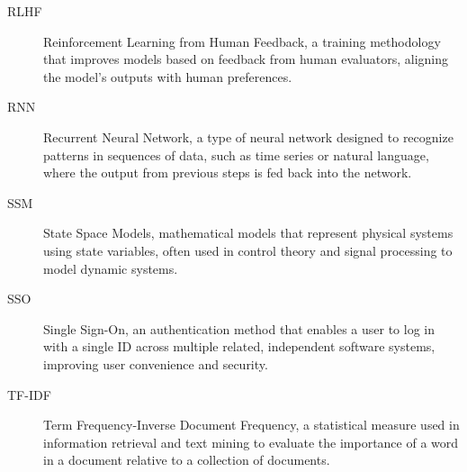 \begin{description}
    \item[RLHF] Reinforcement Learning from Human Feedback, a training methodology that improves models based on feedback from human evaluators, aligning the model's outputs with human preferences.
    \item[RNN] Recurrent Neural Network, a type of neural network designed to recognize patterns in sequences of data, such as time series or natural language, where the output from previous steps is fed back into the network.
    \item[SSM] State Space Models, mathematical models that represent physical systems using state variables, often used in control theory and signal processing to model dynamic systems.
    \item[SSO] Single Sign-On, an authentication method that enables a user to log in with a single ID across multiple related, independent software systems, improving user convenience and security.
    \item[TF-IDF] Term Frequency-Inverse Document Frequency, a statistical measure used in information retrieval and text mining to evaluate the importance of a word in a document relative to a collection of documents.
\end{description}
